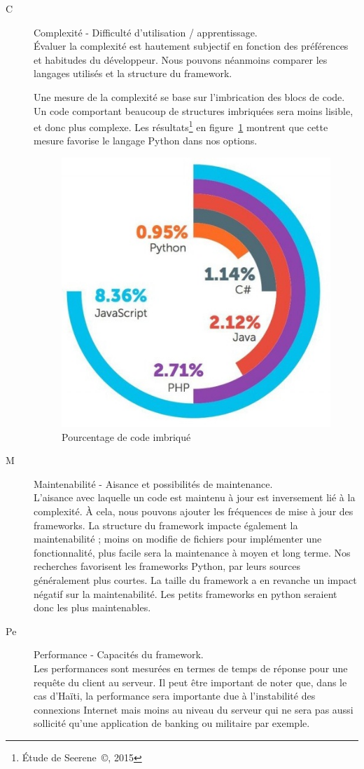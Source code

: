 \documentclass{EPL-master-thesis-covers-FR}
\begin{document}
					\begin{description}
						\item[C] Complexité - Difficulté d'utilisation / apprentissage. \hfill \\
							\'Evaluer la complexité est hautement subjectif en fonction des préférences et habitudes du développeur. Nous pouvons néanmoins comparer les langages utilisés et la structure du framework.

							Une mesure de la complexité se base sur l'imbrication des blocs de code. Un code comportant beaucoup de structures imbriquées sera moins lisible, et donc plus complexe. Les résultats\footnote{\'Etude de Seerene~\copyright, 2015} en figure~\ref{fig:complexity} montrent que cette mesure favorise le langage Python dans nos options.

							\begin{figure}
								\centering
								\includegraphics[width=.4\textwidth]{images/complexity}
								\caption{Pourcentage de code imbriqué}
								\label{fig:complexity}
							\end{figure}

					\item[M] Maintenabilité - Aisance et possibilités de maintenance. \hfill \\
							L'aisance avec laquelle un code est maintenu à jour est inversement lié à la complexité. À cela, nous pouvons ajouter les fréquences de mise à jour des frameworks. La structure du framework impacte également la maintenabilité ; moins on modifie de fichiers pour implémenter une fonctionnalité, plus facile sera la maintenance à moyen et long terme. Nos recherches favorisent les frameworks Python, par leurs sources généralement plus courtes. La taille du framework a en revanche un impact négatif sur la maintenabilité. Les petits frameworks en python seraient donc les plus maintenables.

					\item[Pe] Performance - Capacités du framework. \hfill \\
							Les performances sont mesurées en termes de temps de réponse pour une requête du client au serveur. Il peut être important de noter que, dans le cas d'Haïti, la performance sera importante due à l'instabilité des connexions Internet mais moins au niveau du serveur qui ne sera pas aussi sollicité qu'une application de banking ou militaire par exemple.


\end{description}
\end{document}
